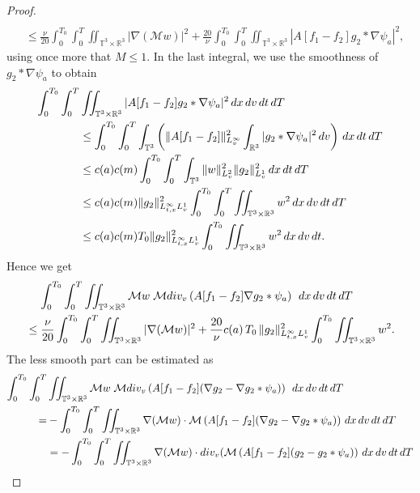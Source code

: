 \documentclass[10pt,a4paper]{amsart}
\newcommand{\R}{\mathbb R}
\newcommand{\T}{\mathbb{T}}
\newcommand{\dT}{\, {\rm d} T}
\newcommand{\dt}{\, {\rm d} t}
\newcommand{\dv}{\, {\rm d} v}
\newcommand{\dx}{\, {\rm d} x}
\begin{document}
\begin{proof}
\begin{align*}
\\
&\leq 
\frac{\nu}{20}\int_0^{T_0} \int_0^{T} \iint_{\T^3 \times \R^3}  |\nabla(\mathcal{M} w)|^2 %
+  \frac{20}{\nu} \int_0^{T_0} \int_0^{T} \iint_{\T^3 \times \R^3}  
|  A[f_1-f_2] g_2 \ast \nabla \psi_a|^2,
\end{align*}
using once more that $M\le 1$. In the last integral, we use the smoothness of $g_2 \ast \nabla \psi_a$ to obtain 
\begin{align*}
   \int_0^{T_0} \int_0^{T}& \iint_{\T^3 \times \R^3}  |  A[f_1-f_2] g_2 \ast \nabla \psi_a|^2 \dx\dv \dt\dT
\\
& \leq   \int_0^{T_0} \int_0^{T} \int_{\T^3} \left(\| A[f_1-f_2] \|^2_{L^\infty_v} \int_{\R^3}  |g_2 \ast \nabla \psi_a|^2 \dv\right) \dx\dt\dT
\\
& \leq  
c(a) c(m) \int_0^{T_0} \int_0^{T} \int_{\T^3} \| w \|^2_{L^2_v} \|g_2\|^2_{L^1_v} \dx\dt\dT
\\
& \le  
c(a) c(m) \|g_2\|^2_{L^\infty_{t,x}L^1_v}  \int_0^{T_0} \int_0^{T} \iint_{\T^3 \times \R^3} w^2 \dx\dv\dt\dT
\\
& \le  
c(a) c(m)  T_0 \|g_2\|^2_{L^\infty_{t,x}L^1_v}  \int_0^{T_0} \iint_{\T^3 \times \R^3} w^2 \dx\dv\dt. 
\end{align*}
Hence we get 
\begin{align*}
& \quad \,
    \int_0^{T_0} \int_0^{T} \iint_{\T^3 \times \R^3}   \mathcal{M} w \; \mathcal{M} \textrm{div}_v \left( A[f_1-f_2] \nabla g_2 \ast \psi_a \right) \; \dx\dv\dt\dT 
\\
&\leq  
\frac{\nu}{20}\int_0^{T_0} \int_0^{T} \iint_{\T^3 \times \R^3}  
|\nabla(\mathcal{M} w)|^2 %
+  \frac{20}{\nu}  c(a) \, T_0 \, \|g_2\|^2_{L^\infty_{t,x}L^1_v}  \int_0^{T_0}  \iint_{\T^3 \times \R^3} w^2. %
\end{align*}
The less smooth part can be estimated as 
\begin{align*}
   \int_0^{T_0} \int_0^{T}& \iint_{\T^3 \times \R^3}    \mathcal{M} w \; \mathcal{M} \textrm{div}_v \left( A[f_1-f_2](\nabla g_2 - \nabla g_2 \ast \psi_a )\right) \; \dx\dv\dt\dT  
\\
   =& - \int_0^{T_0} \int_0^{T} \iint_{\T^3 \times \R^3}  \nabla(\mathcal{M} w) \cdot  \mathcal{M} \left( A[f_1-f_2] (\nabla g_2 - \nabla g_2 \ast \psi_a) \right) \dx\dv\dt\dT 
\\
&= - \int_0^{T_0} \int_0^{T} \iint_{\T^3 \times \R^3}  \nabla(\mathcal{M} w) \cdot  \textrm{div}_v ( \mathcal{M} \left( A[f_1-f_2] ( g_2 -g_2 \ast \psi_a) \right) \dx\dv\dt\dT 

\end{align*}
\end{proof}
\end{document}
